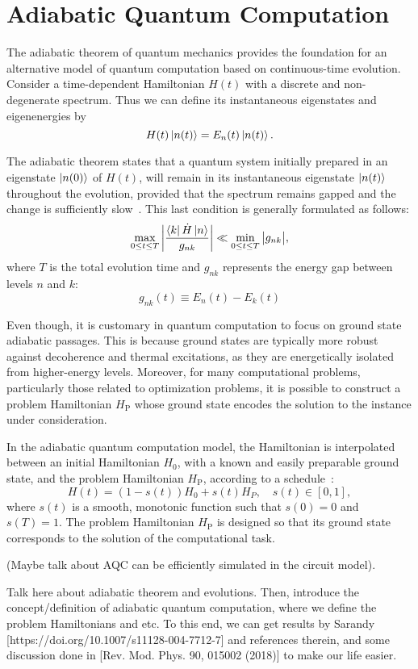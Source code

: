 \section{Adiabatic Quantum Computation}
\label{Section:AQC}

The adiabatic theorem of quantum mechanics provides the foundation for an alternative model
of quantum computation based on continuous-time evolution. Consider a time-dependent Hamiltonian
$H(t)$ with a discrete and non-degenerate spectrum. Thus we can define its instantaneous
eigenstates and eigenenergies by $$H(t) \ket{n(t)} = E_n (t) \ket{n(t)}.$$

\noindent The adiabatic theorem states that a quantum system initially prepared in an eigenstate
$\ket{n(0)}$ of  $H(t)$, will remain in its instantaneous eigenstate $\ket{n(t)}$ throughout
the evolution, provided that the spectrum remains gapped and the change is sufficiently
slow~\cite{sarandy_consistency_2004,albash_adiabatic_2018}. This last condition is generally formulated as follows:
$$\max_{0 \leq t \leq T} \bigg| \dfrac{\bra{k} \dot{H} \ket{n}}{g_{nk}} \bigg| \ll \min_{0 \leq t \leq T} \big| g_{nk} \big|,$$
where $T$ is the total evolution time and $g_{nk}$ represents the energy gap between levels $n$ and $k$: 
$$g_{nk}(t) \equiv E_n(t) - E_k(t)$$

Even though, it is customary in quantum computation to focus on
ground state adiabatic passages. This is because ground states are typically more robust against
decoherence and thermal excitations, as they are energetically isolated from higher-energy levels.
Moreover, for many computational problems, particularly those related to optimization problems,
it is possible to construct a problem Hamiltonian $H_\mathrm{P}$ whose ground state encodes
the solution to the instance under consideration.

In the adiabatic quantum computation model, the Hamiltonian is interpolated between an
initial Hamiltonian $H_0$, with a known and easily preparable ground state, and the problem
Hamiltonian $H_\mathrm{P}$, according to a schedule~\cite{albash_adiabatic_2018}:
$$H(t) = (1 - s(t)) H_0 + s(t) H_P, \quad s(t) \in [0,1],$$
where $s(t)$ is a smooth, monotonic function such that $s(0)=0$ and $s(T)=1$. The problem
Hamiltonian $H_\mathrm{P}$ is designed so that its ground state corresponds to the solution
of the computational task.

(Maybe talk about AQC can be efficiently simulated in the circuit model).


Talk here about adiabatic theorem and evolutions. Then, introduce the concept/definition of
adiabatic quantum computation, where we define the problem Hamiltonians and etc. To this end,
we can get results by Sarandy [https://doi.org/10.1007/s11128-004-7712-7] and references therein,
and some discussion done in [Rev. Mod. Phys. 90, 015002 (2018)] to make our life easier.

